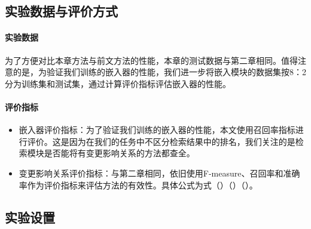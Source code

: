\subsection{实验数据与评价方式}

\paragraph{实验数据} 为了方便对比本章方法与前文方法的性能，本章的测试数据与第二章相同。值得注意的是，为验证我们训练的嵌入器的性能，我们进一步将嵌入模块的数据集按8：2分为训练集和测试集，通过计算评价指标评估嵌入器的性能。

\paragraph{评价指标} 

\begin{itemize}

    \item 嵌入器评价指标：为了验证我们训练的嵌入器的性能，本文使用召回率指标进行评价。这是因为在我们的任务中不区分检索结果中的排名，我们关注的是检索模块是否能将有变更影响关系的方法都查全。

    \item 变更影响关系评价指标：与第二章相同，依旧使用F-measure、召回率和准确率作为评价指标来评估方法的有效性。具体公式为式（）（）（）。
    
\end{itemize}

\subsection{实验设置}

